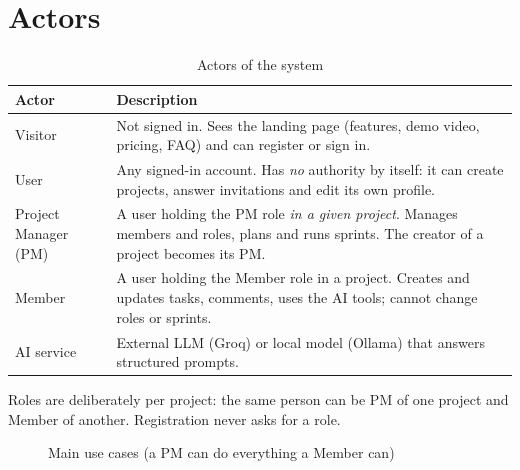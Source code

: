 \documentclass[../main.tex]{subfiles}
\begin{document}
\section{Actors}
\begin{table}[H]
\centering
\caption{Actors of the system}\label{tab:actors}
\renewcommand{\arraystretch}{1.25}
\begin{tabular}{|p{3.2cm}|p{10.5cm}|}
\hline
\textbf{Actor} & \textbf{Description} \\ \hline
Visitor & Not signed in. Sees the landing page (features, demo video, pricing, FAQ) and can register or sign in. \\ \hline
User & Any signed-in account. Has \emph{no} authority by itself: it can create projects, answer invitations and edit its own profile. \\ \hline
Project Manager (PM) & A user holding the PM role \emph{in a given project}. Manages members and roles, plans and runs sprints. The creator of a project becomes its PM. \\ \hline
Member & A user holding the Member role in a project. Creates and updates tasks, comments, uses the AI tools; cannot change roles or sprints. \\ \hline
AI service & External LLM (Groq) or local model (Ollama) that answers structured prompts. \\ \hline
\end{tabular}
\end{table}

Roles are deliberately per project: the same person can be PM of one project and Member of another.
Registration never asks for a role.

\begin{figure}[H]
\centering
{}
\caption{Main use cases (a PM can do everything a Member can)}\label{fig:usecase}
\end{figure}
\end{document}
